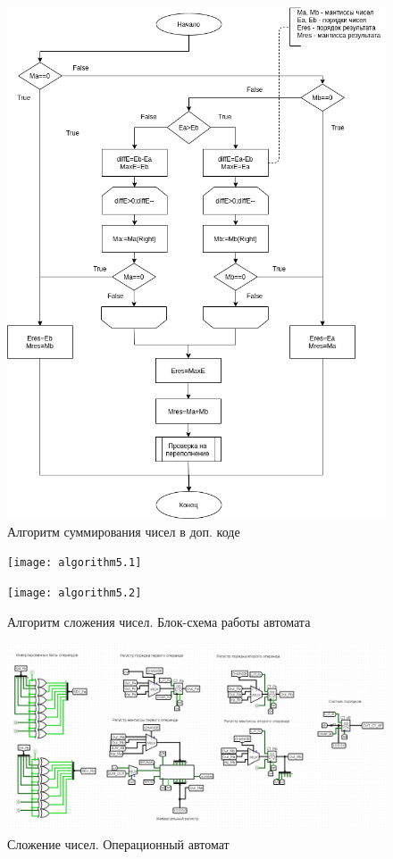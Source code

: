 \documentclass[a4paper,14pt]{extarticle}
\begin{document}
\begin{figure}[h!]
	\centering
	\includegraphics[width=0.7\linewidth]{images/course_algorithm_sum}
	\caption{Алгоритм суммирования чисел в доп. коде}
	\label{fig:coursealgorithmsum}
\end{figure}

\newpage
\begin{figure}[h!]
	\centering
	\texttt{[image: algorithm5.1]}
	\label{fig:coursealgorithmmachine1}
\end{figure}
\begin{figure}[h!]
	\centering
	\texttt{[image: algorithm5.2]}
	\caption {Алгоритм сложения чисел. Блок-схема работы автомата}
	\label{fig:coursealgorithmmachine2}
\end{figure}
\newpage
\begin{figure}[h!]
	\centering
	\includegraphics[width=\linewidth]{images/course_operation_automat2}
	\caption{Сложение чисел. Операционный автомат}
	\label{fig:courseoperationautomat2}
\end{figure}
\end{document}
